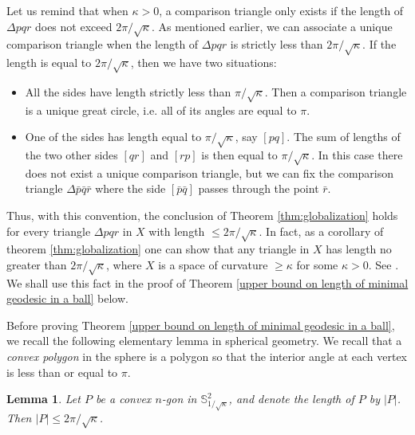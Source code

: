 \documentclass[12pt]{amsart}
\numberwithin{equation}{section}
\newtheorem{lem}[thm]{Lemma}
\theoremstyle{remark}
\begin{document}
	Let us remind that when $\kappa >0$, a comparison triangle only exists if the length of $\Delta pqr$ does not exceed $2\pi/\sqrt\kappa$. As mentioned earlier, we can associate a unique comparison triangle when the length of  $\Delta pqr$ is strictly less than $2\pi/\sqrt{\kappa}$. If the length is equal to $2\pi/\sqrt\kappa$, then we have two situations:
	\begin{itemize}
		\item All the sides have length strictly less than $\pi / \sqrt{\kappa}$. Then a comparison triangle is a unique great circle, i.e. all of its angles are equal to $\pi$.
		\item One of the sides has length equal to  $\pi / \sqrt{\kappa}$, say $[pq]$. The sum of lengths of the two other sides $[qr]$ and $[rp]$ is then equal to  $\pi / \sqrt{\kappa}$. In this case there does not exist a unique comparison triangle, but we can fix the comparison triangle $\Delta \bar{p}\bar{q}\bar{r}$ where the side $[\bar{p}\bar{q}]$ passes through the point $\bar{r}$.
	\end{itemize}
	Thus, with this convention, the conclusion of Theorem \ref{thm:globalization} holds for every triangle  $\Delta pqr$ in $X$ with length $\leq 2\pi/\sqrt{\kappa}$. In fact, as a corollary of theorem \ref{thm:globalization} one can show that any triangle in $X$ has length no greater than $2\pi/\sqrt{\kappa}$, where $X$ is a space of curvature $\geq \kappa$ for some $\kappa >0$. See \cite[Corollary 10.4.2.]{BBI}. We shall use this fact in the proof of Theorem \ref{upper bound on length of minimal geodesic in a ball} below.
	
	Before proving Theorem \ref{upper bound on length of minimal geodesic in a ball}, we recall the following elementary lemma in spherical geometry. We recall that a {\sl convex polygon} in the sphere is a polygon so that the interior angle at each vertex is less than or equal to $\pi$.
	\begin{lem}\label{lem:spherical_polygon}
		Let $P$ be a convex $n$-gon in $\mathbb S^2_{1/\sqrt{\kappa}}$, and denote the length of $P$ by $|P|$. Then $|P|\leq 2\pi/\sqrt{\kappa}$.
	\end{lem}
	
\end{document}
